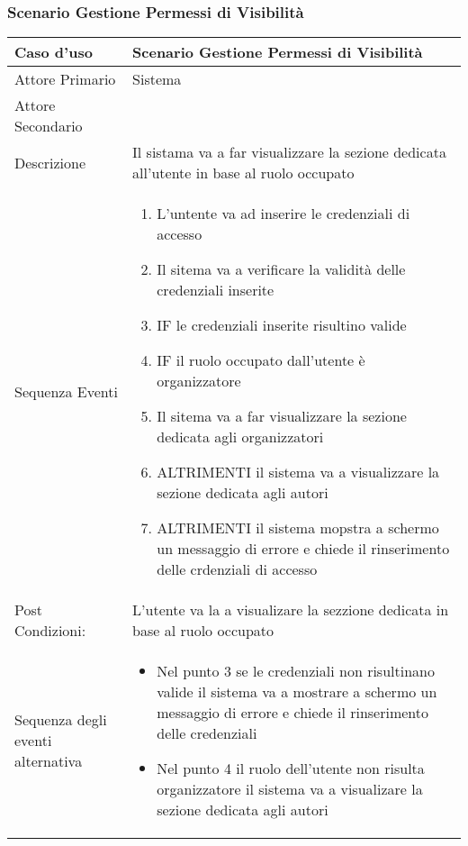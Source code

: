 \subsubsection{Scenario Gestione Permessi di Visibilità}
\begin{tabular}{|p{3cm}|p{7cm}|}
\hline 
\rowcolor{Orchid}
Caso d'uso & Scenario Gestione Permessi di Visibilità \\
\hline
Attore Primario & Sistema\\
\hline
Attore Secondario & \\
\hline
Descrizione & Il sistama va a far visualizzare la sezione dedicata all'utente in base al ruolo occupato\\
\hline
 Sequenza Eventi & 
\begin{enumerate}
  \item L'untente va ad inserire le credenziali di accesso
  \item Il sitema va a verificare la validità delle credenziali inserite 
  \item IF le credenziali inserite risultino valide
  \item IF il ruolo occupato dall'utente è organizzatore
  \item Il sitema va a far visualizzare la sezione dedicata agli organizzatori
  \item ALTRIMENTI il sistema va a visualizzare la sezione dedicata agli autori
  \item ALTRIMENTI il sistema mopstra a schermo un messaggio di errore e chiede il rinserimento delle crdenziali di accesso
\end{enumerate}\\
\hline
Post Condizioni: & L'utente va la a visualizare la sezzione dedicata in base al ruolo occupato\\
\hline
Sequenza degli eventi alternativa & \begin{itemize}
  \item Nel punto 3 se le credenziali non risultinano valide il sistema va a mostrare a schermo un messaggio di errore e chiede il rinserimento delle credenziali
  \item Nel punto 4 il ruolo dell'utente non risulta organizzatore il sistema va a visualizare la sezione dedicata agli autori
\end{itemize} \\
  \hline
\end{tabular}

